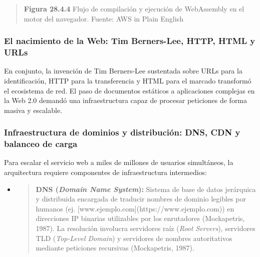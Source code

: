 \begin{quote}
\textbf{Figura 28.4.4} Flujo de compilación y ejecución de WebAssembly
en el motor del navegador. Fuente: AWS in Plain English
\end{quote}

\hypertarget{el-nacimiento-de-la-web-tim-berners-lee-http-html-y-urls}{%
\subsubsection{\texorpdfstring{\textbf{El nacimiento de la Web: Tim
Berners-Lee, HTTP, HTML y
URLs}}{El nacimiento de la Web: Tim Berners-Lee, HTTP, HTML y URLs}}\label{el-nacimiento-de-la-web-tim-berners-lee-http-html-y-urls}}

En conjunto, la invención de Tim Berners-Lee sustentada sobre URLs para
la identificación, HTTP para la transferencia y HTML para el marcado
transformó el ecosistema de red. El paso de documentos estáticos a
aplicaciones complejas en la Web 2.0 demandó una infraestructura capaz
de procesar peticiones de forma masiva y escalable.

\hypertarget{infraestructura-de-dominios-y-distribuciuxf3n-dns-cdn-y-balanceo-de-carga}{%
\subsubsection{\texorpdfstring{\textbf{Infraestructura de dominios y
distribución: DNS, CDN y balanceo de
carga}}{Infraestructura de dominios y distribución: DNS, CDN y balanceo de carga}}\label{infraestructura-de-dominios-y-distribuciuxf3n-dns-cdn-y-balanceo-de-carga}}

Para escalar el servicio web a miles de millones de usuarios
simultáneos, la arquitectura requiere componentes de infraestructura
intermedios:

\begin{itemize}
\item
  \begin{quote}
  \textbf{DNS (\emph{Domain Name System}):} Sistema de base de datos
  jerárquica y distribuida encargada de traducir nombres de dominio
  legibles por humanos (ej.
  {[}www.ejemplo.com{]}(https://www.ejemplo.com)) en direcciones IP
  binarias utilizables por los enrutadores (Mockapetris, 1987). La
  resolución involucra servidores raíz (\emph{Root Servers}), servidores
  TLD (\emph{Top-Level Domain}) y servidores de nombres autoritativos
  mediante peticiones recursivas (Mockapetris, 1987).
  \end{quote}
\end{itemize}

